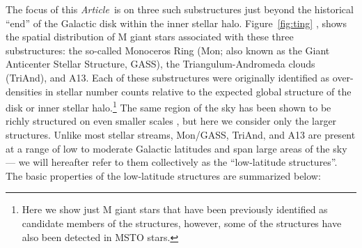 \documentclass[galaxies,article,submit,moreauthors,pdftex,10pt,a4paper]{mdpi}
\newcommand{\documentname}{\emph{Article}}
\begin{document}
The focus of this \documentname\ is on three such substructures just beyond the
historical ``end'' of the Galactic disk within the inner stellar halo.
Figure~\ref{fig:ting} \cite[reproduced with data from previous work, ][]{li17},
shows the spatial distribution of M giant stars associated with these three
substructures: the so-called Monoceros Ring (Mon; also known as the Giant
Anticenter Stellar Structure, GASS), the Triangulum-Andromeda clouds (TriAnd),
and A13.
Each of these substructures were originally identified as over-densities in
stellar number counts relative to the expected global structure of the disk or
inner stellar halo.\footnote{Here we show just M giant stars that have been
previously identified as candidate members of the structures, however, some of
the structures have also been detected in MSTO stars.}
The same region of the sky has been shown to be richly structured on even
smaller scales \cite{slater14,martin14,deason14}, but here we consider only the
larger structures.
Unlike most stellar streams, Mon/GASS, TriAnd, and A13 are present at a range
of low to moderate Galactic latitudes and span large areas of the sky --- we
will hereafter refer to them collectively as the ``low-latitude structures''.
The basic properties of the low-latitude structures are summarized below:
\end{document}
